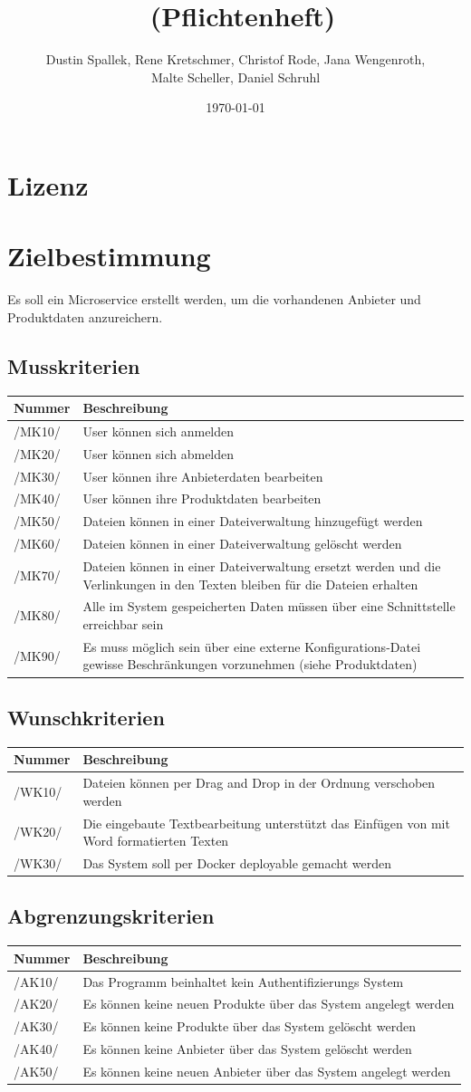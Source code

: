 \documentclass[a4paper,12pt]{article}
\title{\projektName~(Pflichtenheft)}
\author{Dustin Spallek, Rene Kretschmer, Christof Rode, Jana Wengenroth, \\Malte Scheller, Daniel Schruhl}
\date{\today}
\newcommand\addrow[2]{#1 &#2\\ }
\newcommand\addheading[2]{#1 &#2\\ \hline}
\newcommand\tabularhead{\begin{tabular}{lp{13cm}}
\hline
}
\newenvironment{usecase}{\tabularhead}
{\hline\end{tabular}}
\begin{document}
 \setcounter{page}{2}
 \tableofcontents          %
 \clearpage

\section{Lizenz}

 
\section{Zielbestimmung}

Es soll ein Microservice erstellt werden, um die vorhandenen Anbieter und Produktdaten anzureichern.

\subsection{Musskriterien}
\begin{usecase}
  \addheading{Nummer}{Beschreibung} 
  \addrow{/MK10/}{User können sich anmelden}
  \addrow{/MK20/}{User können sich abmelden}
  \addrow{/MK30/}{User können ihre Anbieterdaten bearbeiten}
  \addrow{/MK40/}{User können ihre Produktdaten bearbeiten}
  \addrow{/MK50/}{Dateien können in einer Dateiverwaltung hinzugefügt werden}
  \addrow{/MK60/}{Dateien können in einer Dateiverwaltung gelöscht werden}
  \addrow{/MK70/}{Dateien können in einer Dateiverwaltung ersetzt werden und die
   Verlinkungen in den Texten bleiben für die Dateien erhalten}
  \addrow{/MK80/}{Alle im System gespeicherten Daten müssen über eine Schnittstelle erreichbar sein}
  \addrow{/MK90/}{Es muss möglich sein über eine externe Konfigurations-Datei gewisse Beschränkungen vorzunehmen (siehe Produktdaten)}
\end{usecase}

\subsection{Wunschkriterien}
\begin{usecase}
  \addheading{Nummer}{Beschreibung} 
  \addrow{/WK10/}{Dateien können per Drag and Drop in der Ordnung verschoben werden}
  \addrow{/WK20/}{Die eingebaute Textbearbeitung unterstützt das Einfügen von mit Word formatierten Texten}
  \addrow{/WK30/}{Das System soll per Docker deployable gemacht werden}
\end{usecase}

\subsection{Abgrenzungskriterien}
\begin{usecase}
  \addheading{Nummer}{Beschreibung} 
  \addrow{/AK10/}{Das Programm beinhaltet kein Authentifizierungs System}
  \addrow{/AK20/}{Es können keine neuen Produkte über das System angelegt werden}
  \addrow{/AK30/}{Es können keine Produkte über das System gelöscht werden}
  \addrow{/AK40/}{Es können keine Anbieter über das System gelöscht werden}
  \addrow{/AK50/}{Es können keine neuen Anbieter über das System angelegt werden}
\end{usecase}
\end{document}
